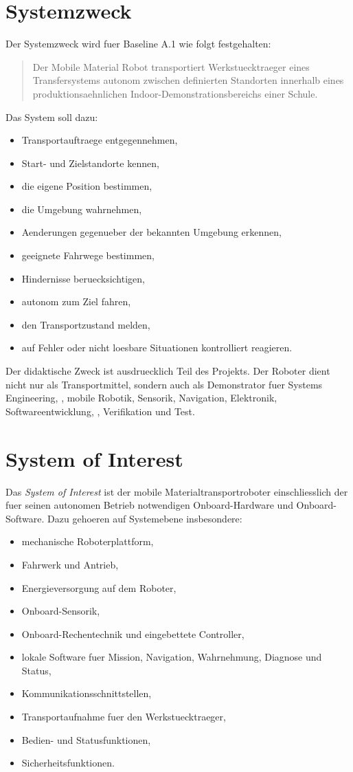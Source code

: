 \section{Systemzweck}

Der Systemzweck wird fuer Baseline A.1 wie folgt festgehalten:
\begin{quote}
Der Mobile Material Robot transportiert Werkstuecktraeger eines Transfersystems autonom zwischen definierten Standorten innerhalb eines produktionsaehnlichen Indoor-Demonstrationsbereichs einer Schule.
\end{quote}

Das System soll dazu:
\begin{itemize}
  \item Transportauftraege entgegennehmen,
  \item Start- und Zielstandorte kennen,
  \item die eigene Position bestimmen,
  \item die Umgebung wahrnehmen,
  \item Aenderungen gegenueber der bekannten Umgebung erkennen,
  \item geeignete Fahrwege bestimmen,
  \item Hindernisse beruecksichtigen,
  \item autonom zum Ziel fahren,
  \item den Transportzustand melden,
  \item auf Fehler oder nicht loesbare Situationen kontrolliert reagieren.
\end{itemize}

Der didaktische Zweck ist ausdruecklich Teil des Projekts. Der Roboter dient nicht nur als Transportmittel, sondern auch als Demonstrator fuer Systems Engineering, \sysml, mobile Robotik, Sensorik, Navigation, Elektronik, Softwareentwicklung, \ros, Verifikation und Test.

\section{System of Interest}

Das \emph{System of Interest} ist der mobile Materialtransportroboter einschliesslich der fuer seinen autonomen Betrieb notwendigen Onboard-Hardware und Onboard-Software. Dazu gehoeren auf Systemebene insbesondere:
\begin{itemize}
  \item mechanische Roboterplattform,
  \item Fahrwerk und Antrieb,
  \item Energieversorgung auf dem Roboter,
  \item Onboard-Sensorik,
  \item Onboard-Rechentechnik und eingebettete Controller,
  \item lokale Software fuer Mission, Navigation, Wahrnehmung, Diagnose und Status,
  \item Kommunikationsschnittstellen,
  \item Transportaufnahme fuer den Werkstuecktraeger,
  \item Bedien- und Statusfunktionen,
  \item Sicherheitsfunktionen.
\end{itemize}

